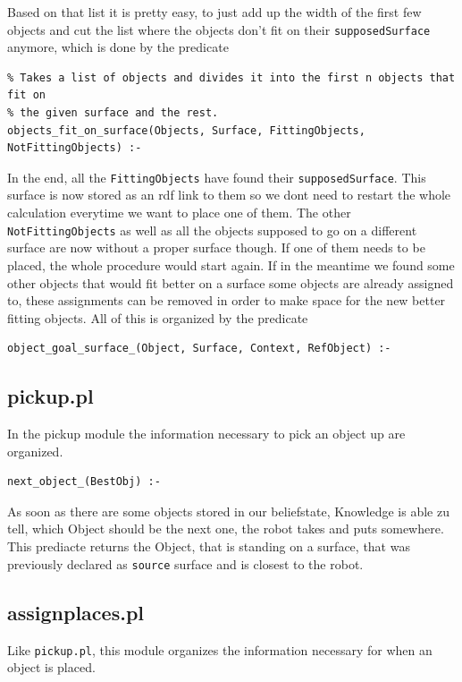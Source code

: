 \documentclass[main.tex]{subfiles}
\begin{document}
Based on that list it is pretty easy, to just add up the width of the first few objects and cut the list where the objects don't fit on their \texttt{supposedSurface} anymore, which is done by the predicate
\begin{lstlisting}
% Takes a list of objects and divides it into the first n objects that fit on
% the given surface and the rest.
objects_fit_on_surface(Objects, Surface, FittingObjects, NotFittingObjects) :-
\end{lstlisting}

In the end, all the \texttt{FittingObjects} have found their \texttt{supposedSurface}. This surface is now stored as an rdf link to them so we dont need to restart the whole calculation everytime we want to place one of them. The other \texttt{NotFittingObjects} as well as all the objects supposed to go on a different surface are now without a proper surface though. If one of them needs to be placed, the whole procedure would start again. If in the meantime we found some other objects that would fit better on a surface some objects are already assigned to, these assignments can be removed in order to make space for the new better fitting objects. All of this is organized by the predicate 
\begin{lstlisting}
object_goal_surface_(Object, Surface, Context, RefObject) :-
\end{lstlisting}

\subsection{pickup.pl}

In the pickup module the information necessary to pick an object up are organized.

\begin{lstlisting}
next_object_(BestObj) :-
\end{lstlisting}
As soon as there are some objects stored in our beliefstate, Knowledge is able zu tell, which Object should be the next one, the robot takes and puts somewhere. This prediacte returns the Object, that is standing on a surface, that was previously declared as \texttt{source} surface and is closest to the robot.

\subsection{assignplaces.pl}

Like \texttt{pickup.pl}, this module organizes the information necessary for when an object is placed.\\
\end{document}
